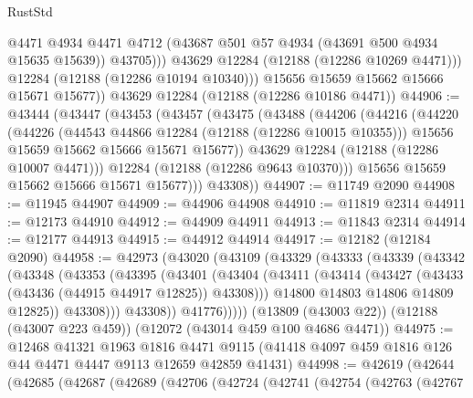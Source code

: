 \begin{lexlean}{RustStd}
\begin{coremodule}
                  @4471
                  @4934
                  @4471
                  @4712
                  (@43687 @501 @57 @4934 (@43691 @500 @4934 @15635 @15639))
                  @43705)))
            @43629
            @12284
            (@12188 (@12286 @10269 @4471)))
          @12284
          (@12188 (@12286 @10194 @10340)))
        @15656
        @15659
        @15662
        @15666
        @15671
        @15677))
    @43629
    @12284
    (@12188 (@12286 @10186 @4471))
@44906 := @43444
    (@43447
      (@43453
        (@43457
          (@43475
            (@43488
              (@44206
                (@44216
                  (@44220
                    (@44226
                      (@44543 @44866 @12284 (@12188 (@12286 @10015 @10355)))
                      @15656
                      @15659
                      @15662
                      @15666
                      @15671
                      @15677))
                  @43629
                  @12284
                  (@12188 (@12286 @10007 @4471)))
                @12284
                (@12188 (@12286 @9643 @10370)))
              @15656
              @15659
              @15662
              @15666
              @15671
              @15677)))
        @43308))
@44907 := @11749 @2090
@44908 := @11945 @44907
@44909 := @44906 @44908
@44910 := @11819 @2314
@44911 := @12173 @44910
@44912 := @44909 @44911
@44913 := @11843 @2314
@44914 := @12177 @44913
@44915 := @44912 @44914
@44917 := @12182 (@12184 @2090)
@44958 := @42973
    (@43020
      (@43109
        (@43329
          (@43333
            (@43339
              (@43342
                (@43348
                  (@43353
                    (@43395
                      (@43401
                        (@43404
                          (@43411
                            (@43414 (@43427 (@43433 (@43436 (@44915 @44917 @12825)) @43308)))
                            @14800
                            @14803
                            @14806
                            @14809
                            @12825))
                        @43308)))
                  @43308))
              @41776)))))
    (@13809 (@43003 @22))
    (@12188 (@43007 @223 @459))
    (@12072 (@43014 @459 @100 @4686 @4471))
@44975 := @12468
    @41321
    @1963
    @1816
    @4471
    @9115
    (@41418 @4097 @459 @1816 @126 @44 @4471 @4447 @9113 @12659 @42859 @41431)
@44998 := @42619
    (@42644
      (@42685
        (@42687
          (@42689
            (@42706
              (@42724
                (@42741
                  (@42754
                    (@42763
                      (@42767

\end{coremodule}
\end{lexlean}
